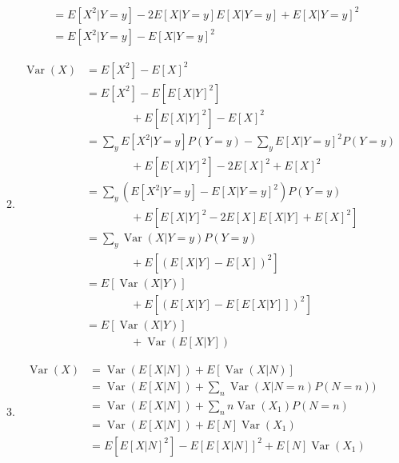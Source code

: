 \documentclass{article}
\DeclareMathOperator{\Var}{Var}
\begin{document}
\begin{enumerate}
\begin{enumerate}
\begin{equation*}
\begin{split}
                    & = E[X^2|Y=y] - 2E[X|Y=y]E[X|Y=y] + E[X|Y=y]^2 \\
                    & = E[X^2|Y=y] - E[X|Y=y]^2
        \end{split}\end{equation*}
    \item
        \begin{equation*}\begin{split}
        \Var(X) & = E[X^2] - E[X]^2 \\
                & = E[X^2] - E[E[X|Y]^2] \\
                                & \qquad\qquad + E[E[X|Y]^2] - E[X]^2 \\
                & = \sum_yE[X^2|Y=y]P(Y=y) - \sum_yE[X|Y=y]^2P(Y=y) \\
                                & \qquad\qquad + E[E[X|Y]^2] - 2E[X]^2 + E[X]^2 \\
                & = \sum_y(E[X^2|Y=y]-E[X|Y=y]^2)P(Y=y) \\
                                & \qquad\qquad + E[E[X|Y]^2 - 2E[X]E[X|Y] + E[X]^2] \\
                & = \sum_y\Var(X|Y=y)P(Y=y) \\
                                & \qquad\qquad + E[(E[X|Y]-E[X])^2] \\
                & = E[\Var(X|Y)] \\
                                & \qquad\qquad + E[(E[X|Y] - E[E[X|Y]])^2] \\
                & = E[\Var(X|Y)] \\
                                & \qquad\qquad + \Var(E[X|Y])
        \end{split}\end{equation*}
    \item
        \begin{equation*}\begin{split}
        \Var(X) & = \Var(E[X|N]) + E[\Var(X|N)] \\
                & = \Var(E[X|N]) + \sum_n \Var(X|N=n)P(N=n)) \\
                & = \Var(E[X|N]) + \sum_n n\Var(X_1)P(N=n) \\
                & = \Var(E[X|N]) + E[N]\Var(X_1) \\
                & = E[E[X|N]^2] - E[E[X|N]]^2 + E[N]\Var(X_1) \\

\end{split}
\end{equation*}
\end{enumerate}
\end{enumerate}
\end{document}
